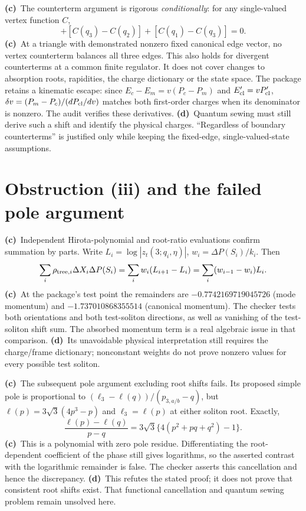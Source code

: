 \documentclass[11pt,a4paper]{article}
\newcommand{\Lc}{\textbf{(c)}\ }
\newcommand{\Ld}{\textbf{(d)}\ }
\begin{document}
\Lc The counterterm argument is rigorous \emph{conditionally}: for any
single-valued vertex function $C$,
\begin{equation}
 [C(q_2)-C(q_1)]+[C(q_3)-C(q_2)]+[C(q_1)-C(q_3)]=0.
\end{equation}
\Lc At a triangle with demonstrated nonzero fixed canonical edge vector,
no vertex counterterm balances all three edges. This also holds for divergent
counterterms at a common finite regulator. It does not cover changes to
absorption roots, rapidities, the charge dictionary or the state space.
The package retains a kinematic escape: since
$E_c-E_m=v(P_c-P_m)$ and $E_{\rm cl}'=vP_{\rm cl}'$,
$\delta v=(P_m-P_c)/(dP_{\rm cl}/dv)$ matches both first-order charges
when its denominator is nonzero. The audit verifies these derivatives.
\Ld Quantum sewing must still derive such a shift and identify the physical
charges. ``Regardless of boundary counterterms'' is justified only while
keeping the fixed-edge, single-valued-state assumptions.

\section{Obstruction (iii) and the failed pole argument}
\Lc Independent Hirota-polynomial and root-ratio evaluations confirm
summation by parts. Write $L_i=\log|z_t(3;q_i,\eta)|$,
$w_i=\Delta P(S_i)/k_i$. Then
\begin{equation}
 \sum_i\rho_{{\rm tree},i}\Delta X_i\Delta P(S_i)
 =\sum_i w_i(L_{i+1}-L_i)=\sum_i(w_{i-1}-w_i)L_i.
\end{equation}
\Lc At the package's test point the remainders are
$-0.7742169719045726$ (mode momentum) and
$-1.737010868355514$ (canonical momentum). The checker tests both
orientations and both test-soliton directions, as well as vanishing of the
test-soliton shift sum. The absorbed momentum term is a real algebraic issue
in that comparison. \Ld Its unavoidable physical interpretation still
requires the charge/frame dictionary; nonconstant weights do not prove
nonzero values for every possible test soliton.

\Lc The subsequent pole argument excluding root shifts fails. Its proposed
simple pole is proportional to $(\ell_3-\ell(q))/(p_{3,a/b}-q)$, but
$\ell(p)=3\sqrt3(4p^3-p)$ and $\ell_3=\ell(p)$ at either soliton root.
Exactly,
\begin{equation}
 \frac{\ell(p)-\ell(q)}{p-q}
 =3\sqrt3\{4(p^2+pq+q^2)-1\}.
\end{equation}
\Lc This is a polynomial with zero pole residue. Differentiating the
root-dependent coefficient of the phase still gives logarithms, so the
asserted contrast with the logarithmic remainder is false. The checker
asserts this cancellation and hence the discrepancy.
\Ld This refutes the stated proof; it does not prove that consistent
root shifts exist. That functional cancellation and quantum sewing problem
remain unsolved here.
\end{document}
